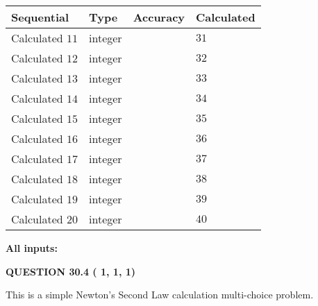 \documentclass[12pt]{article}
\begin{document}
  
\noindent\begin{tabular}{|l|l|l|l|}
\hline
 Sequential & Type & Accuracy & Calculated \\ 
\hline
 
 
  Calculated $          11$ & integer &  & 
  $ 31 $ 
 \\  \hline  
 
 
  Calculated $          12$ & integer &  & 
  $ 32 $ 
 \\  \hline  
 
 
  Calculated $          13$ & integer &  & 
  $ 33 $ 
 \\  \hline  
 
 
  Calculated $          14$ & integer &  & 
  $ 34 $ 
 \\  \hline  
 
 
  Calculated $          15$ & integer &  & 
  $ 35 $ 
 \\  \hline  
 
 
  Calculated $          16$ & integer &  & 
  $ 36 $ 
 \\  \hline  
 
 
  Calculated $          17$ & integer &  & 
  $ 37 $ 
 \\  \hline  
 
 
  Calculated $          18$ & integer &  & 
  $ 38 $ 
 \\  \hline  
 
 
  Calculated $          19$ & integer &  & 
  $ 39 $ 
 \\  \hline  
 
 
  Calculated $          20$ & integer &  & 
  $ 40 $ 
 \\  \hline  
 \end{tabular}
   
   
   
   
\noindent\vspace{0.1in}\hspace{-0.08in} {\textbf{\Large{All inputs: }}}
   
   
  
\vspace{0.2in}
  
{\textbf{\Large{QUESTION
30.4 
 (          1,          1,          1)
}}}
  
  


\noindent{}
This is a simple Newton's Second Law calculation multi-choice problem.  
\noindent{}
\end{document}
